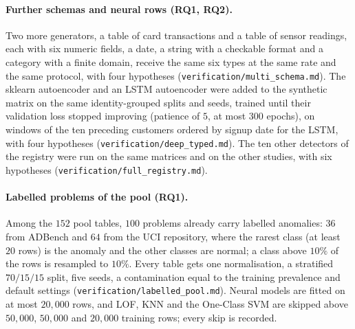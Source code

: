\documentclass[conference]{IEEEtran}
\begin{document}
\paragraph{Further schemas and neural rows (RQ1, RQ2).} Two more generators, a table of card
transactions and a table of sensor readings, each with six numeric fields, a date, a string with
a checkable format and a category with a finite domain, receive the same six types at the same
rate and the same protocol, with four hypotheses
(\texttt{verification/multi\_schema.md}). The sklearn autoencoder and an LSTM autoencoder were
added to the synthetic matrix on the same identity-grouped splits and seeds, trained until their
validation loss stopped improving (patience of $5$, at most $300$ epochs), on windows of the ten
preceding customers ordered by signup date for the LSTM, with four hypotheses
(\texttt{verification/deep\_typed.md}). The ten other detectors of the registry were run on the
same matrices and on the other studies, with six hypotheses
(\texttt{verification/full\_registry.md}).

\paragraph{Labelled problems of the pool (RQ1).} Among the $152$ pool tables, $100$ problems
already carry labelled anomalies: $36$ from ADBench and $64$ from the UCI repository, where the
rarest class (at least $20$ rows) is the anomaly and the other classes are normal; a class above
$10\%$ of the rows is resampled to $10\%$. Every table gets one normalisation, a stratified
$70/15/15$ split, five seeds, a contamination equal to the training prevalence and default
settings (\texttt{verification/labelled\_pool.md}). Neural models are fitted on at most $20{,}000$
rows, and LOF, KNN and the One-Class SVM are skipped above $50{,}000$, $50{,}000$ and $20{,}000$
training rows; every skip is recorded.
\end{document}
